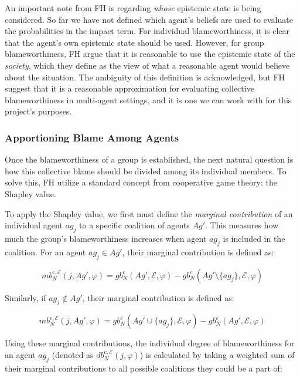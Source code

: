\documentclass{article}
\begin{document}
An important note from FH is regarding \textit{whose} epistemic state is being considered. So far we have not defined which agent's beliefs are used to evaluate the probabilities in the impact term. For individual blameworthiness, it is clear that the agent's own epistemic state should be used. However, for group blameworthiness, FH argue that it is reasonable to use the epistemic state of the \textit{society}, which they define as the view of what a reasonable agent would believe about the situation. The ambiguity of this definition is acknowledged, but FH suggest that it is a reasonable approximation for evaluating collective blameworthiness in multi-agent settings, and it is one we can work with for this project's purposes.

\subsubsection{Apportioning Blame Among Agents}

Once the blameworthiness of a group is established, the next natural question is how this collective blame should be divided among its individual members. To solve this, FH utilize a standard concept from cooperative game theory: the Shapley value.

To apply the Shapley value, we first must define the \textit{marginal contribution} of an individual agent $ag_j$ to a specific coalition of agents $Ag'$. This measures how much the group's blameworthiness increases when agent $ag_j$ is included in the coalition. For an agent $ag_j \in Ag'$, their marginal contribution is defined as:

\begin{equation}
  mb^{c,\mathcal{E}}_N(j, Ag', \varphi) = gb^c_N(Ag', \mathcal{E}, \varphi) - gb^c_N(Ag' \setminus \{ag_j\}, \mathcal{E}, \varphi)
\label{eq:marginal_contribution}
\end{equation}

Similarly, if $ag_j \notin Ag'$, their marginal contribution is defined as:

\begin{equation}
  mb^{c,\mathcal{E}}_N(j, Ag', \varphi) = gb^c_N(Ag' \cup \{ag_j\}, \mathcal{E}, \varphi) - gb^c_N(Ag', \mathcal{E}, \varphi)
\label{eq:marginal_contribution_not_in_coalition}
\end{equation}

Using these marginal contributions, the individual degree of blameworthiness for an agent $ag_j$ (denoted as $db^{c,\mathcal{E}}_N(j, \varphi)$) is calculated by taking a weighted sum of their marginal contributions to all possible coalitions they could be a part of:
\end{document}
